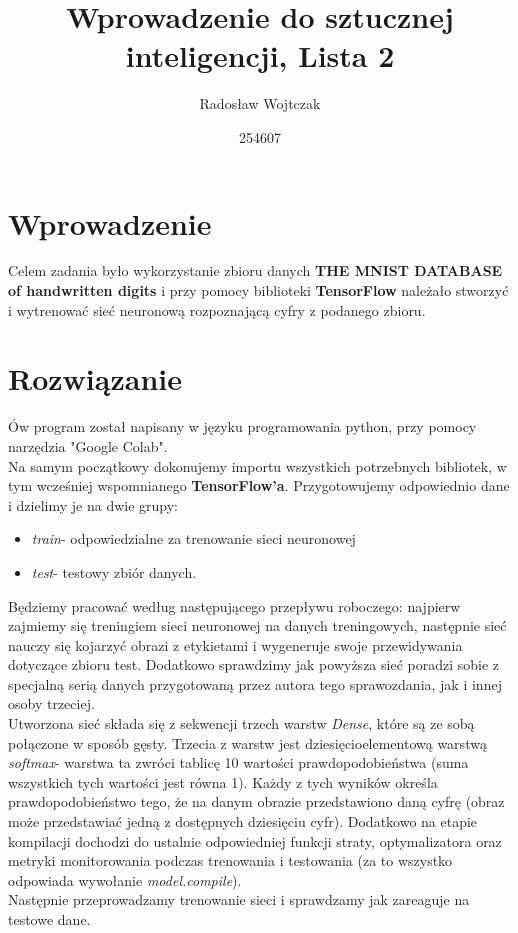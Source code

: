\documentclass[a4paper,14pt]{report}
\title{Wprowadzenie do sztucznej inteligencji, Lista 2}
\author{Radosław Wojtczak}
\date{254607}
\begin{document}
\maketitle
\section{Wprowadzenie}
	Celem zadania było wykorzystanie zbioru danych \textbf{THE MNIST DATABASE of handwritten digits} i przy pomocy biblioteki \textbf{TensorFlow} należało stworzyć i wytrenować sieć neuronową rozpoznającą cyfry z podanego zbioru.
\section{Rozwiązanie}
	Ów program został napisany w języku programowania python, przy pomocy narzędzia "Google Colab".\\
	Na samym początkowy dokonujemy importu wszystkich potrzebnych bibliotek, w tym wcześniej wspomnianego \textbf{TensorFlow'a}. Przygotowujemy odpowiednio dane i dzielimy je na dwie grupy:
	\begin{itemize}
		\item \textit{train}- odpowiedzialne za trenowanie sieci neuronowej
		\item \textit{test}- testowy zbiór danych.
	\end{itemize}
	Będziemy pracować według następującego przepływu roboczego: najpierw zajmiemy się treningiem sieci neuronowej na danych treningowych, następnie sieć nauczy się kojarzyć obrazi z etykietami i wygeneruje swoje przewidywania dotyczące zbioru test. 
	Dodatkowo sprawdzimy jak powyższa sieć poradzi sobie z specjalną serią danych przygotowaną przez autora tego sprawozdania, jak i innej osoby trzeciej. \\
	Utworzona sieć składa się z sekwencji trzech warstw \textit{Dense}, które są ze sobą połączone w sposób gęsty. Trzecia z warstw jest dziesięcioelementową warstwą \textit{softmax}- warstwa ta zwróci tablicę 10 wartości prawdopodobieństwa (suma wszystkich tych wartości jest równa 1). Każdy z tych wyników określa prawdopodobieństwo tego, że na danym obrazie przedstawiono daną cyfrę (obraz może przedstawiać jedną z dostępnych dziesięciu cyfr).
	Dodatkowo na etapie kompilacji dochodzi do ustalnie odpowiedniej funkcji straty, optymalizatora oraz metryki monitorowania podczas trenowania i testowania (za to wszystko odpowiada wywołanie \textit{model.compile}). \\
	Następnie przeprowadzamy trenowanie sieci i sprawdzamy jak zareaguje na testowe dane.
\end{document}
